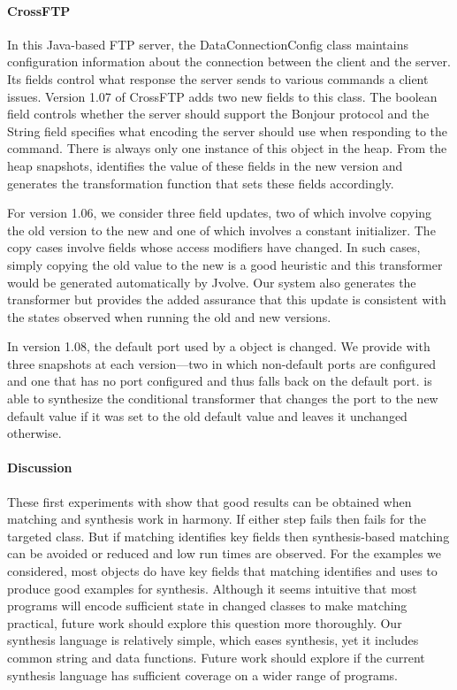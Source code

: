 \paragraph*{CrossFTP}
In this Java-based FTP server, the \textsf{\small{DataConnectionConfig}} class
maintains configuration information about the connection between the client
and the server. Its fields control what response the server sends to
various commands a client issues. Version 1.07 of CrossFTP adds two new
fields to this class. The boolean field  controls whether the
server should support the Bonjour protocol and the String field
 specifies what encoding the server should use when responding to
the  command. There is always only one instance of this object in the
heap. From the heap snapshots, \TOS identifies the value of these fields in the
new version and generates the transformation function that sets these fields accordingly.

For version 1.06, we consider three field updates, two of which
involve copying the old version to the new and one of which involves
a constant initializer.  The copy cases involve fields whose access
modifiers have changed.  In such cases, simply copying the old value
to the new is a good heuristic and this transformer would be generated
automatically by Jvolve.  Our system also generates the transformer
but provides the added assurance that this update is consistent with
the states observed when running the old and new versions.

In version 1.08, the default port used by a 
object is changed.  We provide \TOS with three snapshots at each
version---two in which non-default ports are configured and one that
has no port configured and thus falls back on the default port.  \TOS
is able to synthesize the conditional transformer that changes the
port to the new default value if it was set to the old default value
and leaves it unchanged
otherwise.

\paragraph*{Discussion} These first experiments with \TOS show that
good results can be obtained when matching and synthesis work in harmony.
If either step fails then \TOS fails for the targeted class.  But if
matching identifies key fields then synthesis-based matching can
be avoided or reduced and low \TOS run times are observed.
For the
examples we considered, most objects do have key fields that matching identifies and
uses to produce good examples for synthesis. Although it seems
intuitive that most programs will encode sufficient state in changed
classes to make matching practical, future work should explore this
question more thoroughly. Our synthesis language is relatively simple,
which eases synthesis, yet it includes common string and data
functions.  Future work should explore if the current synthesis
language has sufficient coverage on a wider range of programs.

